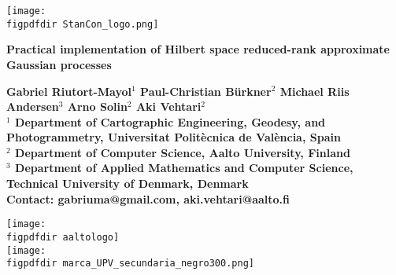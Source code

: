 \documentclass[portrait,a1,final]{a0poster} %
\def\figpdfdir{fig/} %
\begin{document}
\thispagestyle{empty} %



\begin{minipage}[t]{0.98\linewidth} 
\vspace{0pt} %

\centering

\vspace{-0.015\linewidth}

\begin{minipage}[t]{0.17\linewidth} %
\vspace{1.3cm}

\begin{adjustwidth}{-0.3cm}{-0cm}
\texttt{[image: \\figpdfdir StanCon\_logo.png]}
\end{adjustwidth}

\end{minipage} %
\begin{minipage}[t]{0.76\linewidth}
\vspace{0pt}

\centering
{\renewcommand{\baselinestretch}{0.6} 
\textcolor{aaltoGreen}{\huge{\bfseries{\textsf{Practical implementation of Hilbert space reduced-rank approximate Gaussian processes} }}}
\par}

\vspace{0.015\linewidth}

\normalsize{\textsf{\bfseries{Gabriel Riutort-Mayol$^{1}$ \;\;\; Paul-Christian Bürkner$^2$ \;\;\; Michael Riis Andersen$^{3}$ \;\;\; Arno Solin$^{2}$ \;\;\; Aki Vehtari$^{2}$}}}\\[2mm]

\textcolor{aaltoGray}{\textsf{\bfseries{\small
$^1$ Department of Cartographic Engineering, Geodesy, and Photogrammetry, Universitat Polit\`ecnica de Val\`encia, Spain 
\\
$^2$ Department of Computer Science, Aalto University, Finland
\\
$^3$ Department of Applied Mathematics and Computer Science, Technical University of Denmark, Denmark
\\[-2mm]
\footnotesize Contact: gabriuma@gmail.com, aki.vehtari@aalto.fi}}}
				
\end{minipage}
\begin{minipage}[t]{0.06\linewidth}
\vspace{0.7cm}

{\centering \texttt{[image: \\figpdfdir aaltologo]}}\\[0.5cm]
\texttt{[image: \\figpdfdir marca\_UPV\_secundaria\_negro300.png]}
\end{minipage}

\end{minipage}
\end{document}

